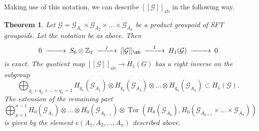 \documentclass[11pt]{article}
\newtheorem{theorem}{Theorem}[section]
\theoremstyle{definition}
\numberwithin{equation}{section}
\newcommand{\Tor}{\operatorname{Tor}}
\newcommand{\ab}{\mathrm{ab}}
\newcommand{\G}{\mathcal{G}}
\newcommand{\Z}{\mathbb{Z}}
\begin{document}
Making use of this notation, 
we can describe $[[\G]]_\ab$ in the following way. 

\begin{theorem}\label{prodSFTAbel}
Let $\G=\G_{A_1}\times\G_{A_2}\times\dots\times\G_{A_n}$ be 
a product groupoid of SFT groupoids. 
Let the notation be as above. 
Then 
\[
\begin{CD}
0@>>>S_0\otimes\Z_2@>j>>[[\G]]_\ab@>I>>H_1(\G)@>>>0
\end{CD}
\]
is exact. 
The quotient map $[[\G]]_\ab\to H_1(G)$ has a right inverse 
on the subgroup 
\[
\bigoplus_{q_1+q_2+\dots+q_n=1}
H_{q_1}(\G_{A_1})\otimes H_{q_2}(\G_{A_2})\otimes\dots
\otimes H_{q_n}(\G_{A_n})\subset H_1(\G). 
\]
The extension of the remaining part 
\[
\bigoplus_{p=1}^{n-1}
H_0(\G_{A_1})\otimes\dots\otimes H_0(\G_{A_{p-1}})
\otimes\Tor(H_0(\G_{A_p}),H_0(\G_{A_{p+1}}\times\dots\times \G_{A_n}))
\]
is given by the element $e(A_1,A_2,\dots,A_n)$ described above. 
\end{theorem}
\end{document}
